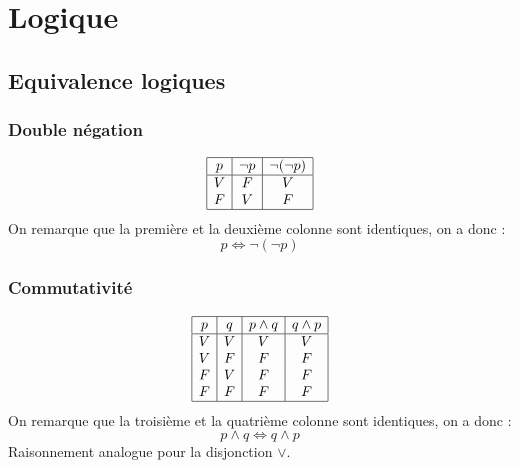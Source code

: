 \documentclass[../main.tex]{subfiles}
\begin{document}
\setcounter{chapter}{1}
\chapter{Logique}
\tableofcontents
\clearpage

\setcounter{section}{16}
\section{Equivalence logiques}
\subsection{Double négation}
\begin{displaymath}
    \begin{array}{|c|c|c|}
    \hline
    p & \lnot p & \lnot(\lnot p)\\ %
    \hline %
    V & F & V\\
    F & V & F\\
    \hline
    \end{array}
\end{displaymath}
On remarque que la première et la deuxième colonne sont identiques, on a donc :
$$p \iff \lnot(\lnot p)$$

\subsection{Commutativité}
\begin{displaymath}
    \begin{array}{|c|c|c|c|}
    \hline
    p & q & p \land q & q \land p\\ %
    \hline %
    V & V & V & V\\
    V & F & F & F\\
    F & V & F & F\\
    F & F & F & F\\
    \hline
    \end{array}
\end{displaymath}
On remarque que la troisième et la quatrième colonne sont identiques, on a donc :
$$p \land q \iff q \land p$$
Raisonnement analogue pour la disjonction $\lor$.
\end{document}
